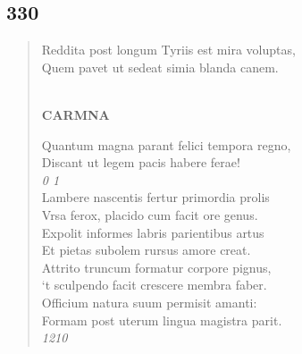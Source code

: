 \documentclass[11pt, a4paper]{report}
\begin{document}
            \subsection*{330}
      \begin{verse}
      Reddita post longum Tyriis est mira voluptas, \\ Quem pavet ut sedeat simia blanda canem. \\ 
        ﻿\pagebreak 
     \marginpar{[268]} \begin{center} \textbf{CARMNA} \end{center}Quantum magna parant felici tempora regno, \\ Discant ut legem pacis habere ferae! \\ \textit{0 1} \\ Lambere nascentis fertur primordia prolis \\ Vrsa ferox, placido cum facit ore genus. \\ Expolit informes labris parientibus artus \\ Et pietas subolem rursus amore creat. \\ Attrito truncum formatur corpore pignus, \\ ‘t sculpendo facit crescere membra faber. \\ Officium natura suum permisit amanti: \\ Formam post uterum lingua magistra parit. \\ \textit{1210} \\ 
      \end{verse}
  
\end{document}
